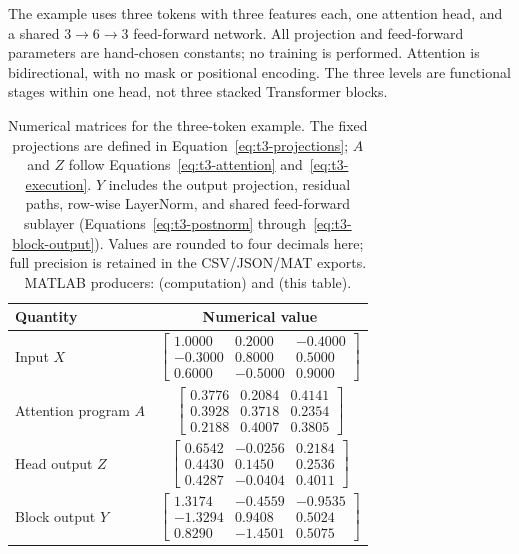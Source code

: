 The example uses three tokens with three features each, one attention head, and a shared $3\to6\to3$ feed-forward network. All projection and feed-forward parameters are hand-chosen constants; no training is performed. Attention is bidirectional, with no mask or positional encoding. The three levels are functional stages within one head, not three stacked Transformer blocks.

\begin{table}[htbp]\centering\small
\renewcommand{\arraystretch}{1.35}
\begin{tabular}{lc}\toprule
Quantity & Numerical value \\
\midrule
Input $X$ & $\begin{bmatrix}1.0000 & 0.2000 & -0.4000 \\ -0.3000 & 0.8000 & 0.5000 \\ 0.6000 & -0.5000 & 0.9000\end{bmatrix}$ \\[0.5em]
Attention program $A$ & $\begin{bmatrix}0.3776 & 0.2084 & 0.4141 \\ 0.3928 & 0.3718 & 0.2354 \\ 0.2188 & 0.4007 & 0.3805\end{bmatrix}$ \\[0.5em]
Head output $Z$ & $\begin{bmatrix}0.6542 & -0.0256 & 0.2184 \\ 0.4430 & 0.1450 & 0.2536 \\ 0.4287 & -0.0404 & 0.4011\end{bmatrix}$ \\[0.5em]
Block output $Y$ & $\begin{bmatrix}1.3174 & -0.4559 & -0.9535 \\ -1.3294 & 0.9408 & 0.5024 \\ 0.8290 & -1.4501 & 0.5075\end{bmatrix}$ \\[0.5em]
\bottomrule\end{tabular}
\caption[Three-token example: input, attention, head, and block outputs]{Numerical matrices for the three-token example. The fixed projections are defined in Equation~\eqref{eq:t3-projections}; $A$ and $Z$ follow Equations~\eqref{eq:t3-attention} and~\eqref{eq:t3-execution}. $Y$ includes the output projection, residual paths, row-wise LayerNorm, and shared feed-forward sublayer (Equations~\eqref{eq:t3-postnorm} through~\eqref{eq:t3-block-output}). Values are rounded to four decimals here; full precision is retained in the CSV/JSON/MAT exports. MATLAB producers:  (computation) and  (this table).}
\label{tab:t3-numeric}\end{table}

